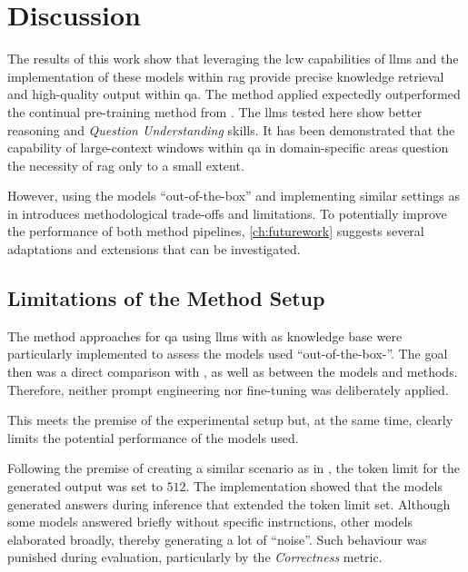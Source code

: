 \chapter{Discussion}\label{ch:discussion}

The results of this work show that leveraging the \ac{lcw} capabilities of \acp{llm} and the implementation of these models within \ac{rag} provide precise knowledge retrieval and high-quality output within \ac{qa}.
The method applied expectedly outperformed the continual pre-training method from \citet{Paul_Keller}.
The \acp{llm} tested here show better reasoning and \textit{Question Understanding} skills.
It has been demonstrated that the capability of large-context windows within \ac{qa} in domain-specific areas question the necessity of \ac{rag} only to a small extent.

However, using the models \enquote{out-of-the-box} and implementing similar settings as in \citet{Paul_Keller} introduces methodological trade-offs and limitations.
To potentially improve the performance of both meth\-od pipelines, \cref{ch:futurework} suggests several adaptations and extensions that can be investigated.

\section{Limitations of the Method Setup}

The method approaches for \ac{qa} using \acp{llm} with \citet{bb2} as knowledge base were particularly implemented to assess the models used \enquote{out-of-the-box-}.
The goal then was a direct comparison with \citet{Paul_Keller}, as well as between the models and methods.
Therefore, neither prompt engineering nor fine-tuning was deliberately applied.

This meets the premise of the experimental setup but, at the same time, clearly limits the potential performance of the models used.

Following the premise of creating a similar scenario as in \citet{bb2}, the token limit for the generated output was set to $512$.
The implementation showed that the models  generated answers during inference that extended the token limit set.
Although some models answered briefly without specific instructions, other models elaborated broadly, thereby generating a lot of \enquote{noise}.
Such behaviour was punished during evaluation, particularly by the \textit{Correctness} metric.

